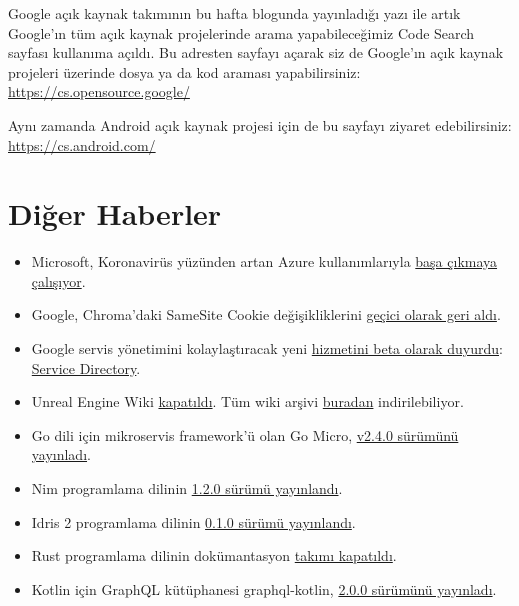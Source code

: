 \documentclass[11pt]{article}
\begin{document}
Google açık kaynak takımının bu hafta blogunda yayınladığı yazı ile artık
Google'ın tüm açık kaynak projelerinde arama yapabileceğimiz Code Search
sayfası kullanıma açıldı. Bu adresten sayfayı açarak siz de Google'ın açık
kaynak projeleri üzerinde dosya ya da kod araması yapabilirsiniz:
\url{https://cs.opensource.google/}

Aynı zamanda Android açık kaynak projesi için de bu sayfayı ziyaret
edebilirsiniz: \url{https://cs.android.com/}
\section{Diğer Haberler}
\label{sec:orgc812277}
\begin{itemize}
\item Microsoft, Koronavirüs yüzünden artan Azure kullanımlarıyla \href{https://mspoweruser.com/azure-overwhelmed-775-percent-demand-in-lockdown/}{başa çıkmaya
çalışıyor}.
\item Google, Chroma'daki SameSite Cookie değişikliklerini \href{https://blog.chromium.org/2020/04/temporarily-rolling-back-samesite.html?m=1}{geçici olarak geri
aldı}.
\item Google servis yönetimini kolaylaştıracak yeni \href{https://cloud.google.com/blog/products/networking/introducing-service-directory}{hizmetini beta olarak duyurdu}:
\href{https://cloud.google.com/service-directory}{Service Directory}.
\item Unreal Engine Wiki \href{https://forums.unrealengine.com/unreal-engine/announcements-and-releases/1739154-changes-to-the-official-unreal-engine-wiki}{kapatıldı}. Tüm wiki arşivi \href{https://epicgames.ent.box.com/s/2e5hhlvqyu9octooxbkgwt2xdmmrea9z}{buradan} indirilebiliyor.
\item Go dili için mikroservis framework'ü olan Go Micro, \href{https://github.com/micro/go-micro/releases/tag/v2.4.0}{v2.4.0 sürümünü
yayınladı}.
\item Nim programlama dilinin \href{https://nim-lang.org/blog/2020/04/03/version-120-released.html}{1.2.0 sürümü yayınlandı}.
\item Idris 2 programlama dilinin \href{https://www.idris-lang.org/idris-2-version-010-released.html}{0.1.0 sürümü yayınlandı}.
\item Rust programlama dilinin dokümantasyon \href{https://blog.rust-lang.org/inside-rust/2020/03/27/goodbye-docs-team.html}{takımı kapatıldı}.
\item Kotlin için GraphQL kütüphanesi graphql-kotlin, \href{https://github.com/ExpediaGroup/graphql-kotlin/releases}{2.0.0 sürümünü yayınladı}.

\end{itemize}
\end{document}
